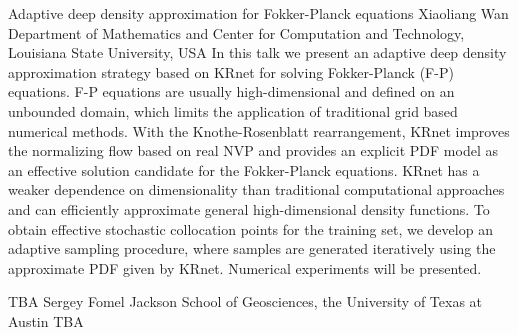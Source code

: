 \begin{addmargin}[2em]{0em}
\vspace{1.5ex}
\abs
{Adaptive deep density approximation for Fokker-Planck equations}
{Xiaoliang Wan}
{Department of Mathematics and Center for Computation and Technology, Louisiana State University, USA}
{In this talk we present an adaptive deep density approximation strategy based on KRnet for solving Fokker-Planck (F-P) equations. F-P equations are usually high-dimensional and defined on an unbounded domain, which limits the application of traditional grid based numerical methods. With the Knothe-Rosenblatt rearrangement, KRnet improves the normalizing flow based on real NVP and provides an explicit PDF model as an effective solution candidate for the Fokker-Planck equations. KRnet has a weaker dependence on dimensionality than traditional computational approaches and can efficiently approximate general high-dimensional density functions. To obtain effective stochastic collocation points for the training set, we develop an adaptive sampling procedure, where samples are generated iteratively using the approximate PDF given by KRnet. Numerical experiments will be presented.}


\vspace{1.5ex}
\abs
{TBA}
{Sergey Fomel}
{Jackson School of Geosciences, the University of Texas at Austin}
{TBA}
\end{addmargin}
